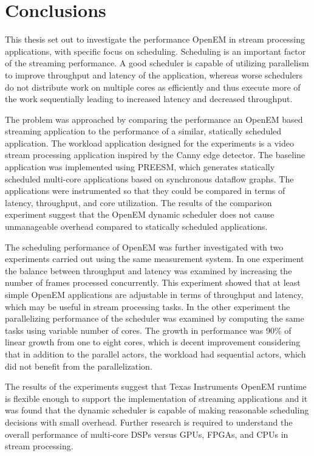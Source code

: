 \chapter{Conclusions}
\label{chapter:conclusion}
This thesis set out to investigate the performance OpenEM in stream processing applications, with specific focus on scheduling. Scheduling is an important factor of the streaming performance. A good scheduler is capable of utilizing parallelism to improve throughput and latency of the application, whereas worse schedulers do not distribute work on multiple cores as efficiently and thus execute more of the work sequentially leading to increased latency and decreased throughput.

The problem was approached by comparing the performance an OpenEM based streaming application to the performance of a similar, statically scheduled application. The workload application designed for the experiments is a video stream processing application inspired by the Canny edge detector. The baseline application was implemented using PREESM, which generates statically scheduled multi-core applications based on synchronous dataflow graphs. The applications were instrumented so that they could be compared in terms of latency, throughput, and core utilization. The results of the comparison experiment suggest that the OpenEM dynamic scheduler does not cause unmanageable overhead compared to statically scheduled applications.

The scheduling performance of OpenEM was further investigated with two experiments carried out using the same measurement system. In one experiment the balance between throughput and latency was examined by increasing the number of frames processed concurrently. This experiment showed that at least simple OpenEM applications are adjustable in terms of throughput and latency, which may be useful in stream processing tasks. In the other experiment the parallelizing performance of the scheduler was examined by computing the same tasks using variable number of cores. The growth in performance was 90\% of linear growth from one to eight cores, which is decent improvement considering that in addition to the parallel actors, the workload had sequential actors, which did not benefit from the parallelization.

The results of the experiments suggest that Texas Instruments OpenEM runtime is flexible enough to support the implementation of streaming applications and it was found that the dynamic scheduler is capable of making reasonable scheduling decisions with small overhead. Further research is required to understand the overall performance of multi-core DSPs versus GPUs, FPGAs, and CPUs in stream processing.

